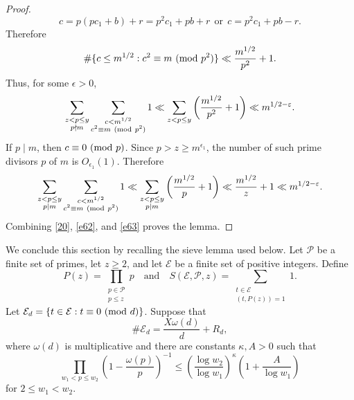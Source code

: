 \documentclass[12pt,a4paper,reqno]{amsart}
\numberwithin{equation}{section}
\def\pmod #1{\ ({\rm{mod}}\ #1)}
\theoremstyle{plain}
\theoremstyle{definition}
\begin{document}
\begin{proof}
$$c=p(pc_{1}+b)+ r=p^{2}c_{1}+pb+r\ \ \mbox{or}\ \ c=p^{2}c_{1}+pb-r.$$
Therefore
\[
\#\{c \leq m^{1/2}: c^2 \equiv m \pmod{p^2}\} \ll \frac{m^{1/2}}{p^2}+1. 
\]
Thus, for some $\epsilon>0$,
\begin{equation}\label{e62}
\sum_{\substack{z<p\leq y\\ p\nmid m}}
\sum_{\substack{c<m^{1/2}\\ c^2\equiv m\pmod {p^2}}}1
\ll
\sum_{z<p\leq y}\left(\frac{m^{1/2}}{p^2}+1\right)
\ll m^{1/2-\varepsilon}.
\end{equation}
If $p\mid m$, then $c\equiv0\pmod p$. Since $p>z\geq m^{\epsilon_1}$, the number of such prime divisors $p$ of $m$ is $O_{\epsilon_1}(1)$. Therefore
\begin{equation}\label{e63}
\sum_{\substack{z<p\leq y\\ p\mid m}}
\sum_{\substack{c<m^{1/2}\\ c^2\equiv m\pmod {p^2}}}1
\ll
\sum_{\substack{z<p\leq y\\ p\mid m}}
\left(\frac{m^{1/2}}p+1\right)
\ll \frac{m^{1/2}}z+1
\ll m^{1/2-\varepsilon}.
\end{equation}
Combining \eqref{20}, \eqref{e62}, and \eqref{e63} proves the lemma.
\end{proof}

We conclude this section by recalling the sieve lemma used below. Let $\mathcal P$ be a finite set of primes, let $z\geq2$, and let $\mathcal E$ be a finite set of positive integers. Define
\[
P(z)=\prod_{\substack{p\in \mathcal{P} \\ p \leq  z}}p \quad \text{and} \quad S(\mathcal{E},\mathcal{P},z)=\!\!\!\sum_{\substack{t\in\mathcal{E} \\ (t,P(z))=1}}\!\!\!1.
\]
Let $\mathcal E_d=\{t\in\mathcal E:t\equiv0\pmod d\}$. Suppose that
\[
\#\mathcal E_d=\frac{X\omega(d)}d+R_d,
\]
where $\omega(d)$ is multiplicative and there are constants $\kappa,A>0$ such that
\begin{equation}\label{e73}
\prod_{w_1<p\leq w_2}
\left(1-\frac{\omega(p)}p\right)^{-1}
\leq
\left(\frac{\log w_2}{\log w_1}\right)^\kappa
\left(1+\frac A{\log w_1}\right)
\end{equation}
for $2\leq w_1<w_2$.
\end{document}
